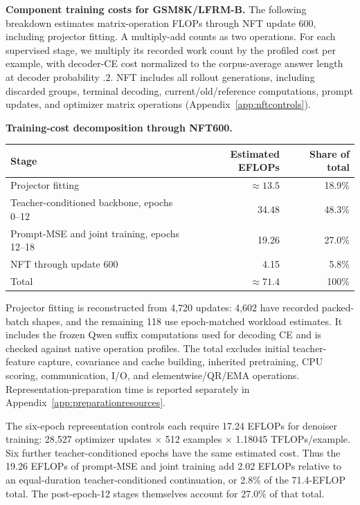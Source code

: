 \documentclass{article}
\newenvironment{revision}{\begingroup\color{blue}}{\endgroup}
\newcommand{\reviewcolor}{\color{blue}}
\begin{document}
\begin{revision}
\noindent\begin{minipage}{\linewidth}\reviewcolor
\textbf{Component training costs for GSM8K/LFRM-B.} The following breakdown estimates matrix-operation FLOPs through NFT update 600, including projector fitting. A multiply-add counts as two operations. For each supervised stage, we multiply its recorded work count by the profiled cost per example, with decoder-CE cost normalized to the corpus-average answer length at decoder probability $.2$. NFT includes all rollout generations, including discarded groups, terminal decoding, current/old/reference computations, prompt updates, and optimizer matrix operations (Appendix~\ref{app:nftcontrols}).
\begin{center}\small
\textbf{Training-cost decomposition through NFT600.}\par\smallskip
\begin{tabular}{@{}lrr@{}}\toprule
Stage & Estimated EFLOPs & Share of total\\\midrule
Projector fitting & $\approx13.5$ & 18.9\%\\
Teacher-conditioned backbone, epochs 0--12 & 34.48 & 48.3\%\\
Prompt-MSE and joint training, epochs 12--18 & 19.26 & 27.0\%\\
NFT through update 600 & 4.15 & 5.8\%\\\midrule
Total & $\approx71.4$ & 100\%\\\bottomrule
\end{tabular}
\end{center}
Projector fitting is reconstructed from 4,720 updates: 4,602 have recorded packed-batch shapes, and the remaining 118 use epoch-matched workload estimates. It includes the frozen Qwen suffix computations used for decoding CE and is checked against native operation profiles. The total excludes initial teacher-feature capture, covariance and cache building, inherited pretraining, CPU scoring, communication, I/O, and elementwise/QR/EMA operations. Representation-preparation time is reported separately in Appendix~\ref{app:preparationresources}.

The six-epoch representation controls each require 17.24 EFLOPs for denoiser training: 28,527 optimizer updates $\times$ 512 examples $\times$ 1.18045 TFLOPs/example. Six further teacher-conditioned epochs have the same estimated cost. Thus the 19.26 EFLOPs of prompt-MSE and joint training add 2.02 EFLOPs relative to an equal-duration teacher-conditioned continuation, or 2.8\% of the 71.4-EFLOP total. The post-epoch-12 stages themselves account for 27.0\% of that total.
\end{minipage}



\end{revision}
\end{document}
